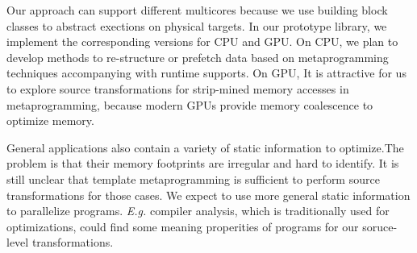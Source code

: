 Our approach can support different multicores because we use building
block classes to abstract exections on physical targets. In our
prototype library, we implement the corresponding versions for CPU
and GPU.  On CPU, we plan to develop methods to re-structure or
prefetch data based on metaprogramming techniques accompanying with runtime
supports. On GPU, It is attractive for us to explore source transformations for
strip-mined memory accesses in metaprogramming, because modern GPUs
provide memory coalescence to optimize memory.


General applications also contain a variety of static information to
optimize.The problem is that their memory footprints are irregular and
hard to identify. It is still unclear that template metaprogramming is
sufficient to perform source transformations for those
cases. We expect to use more general static information to
parallelize programs. \textit{E.g.} compiler analysis, which is traditionally used
for optimizations, could find some meaning properities of programs for
our soruce-level transformations.